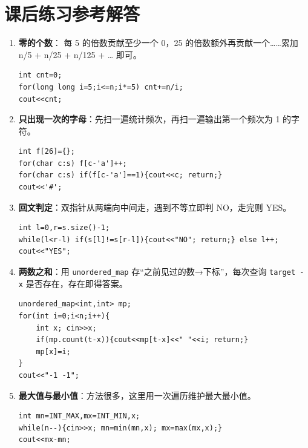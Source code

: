 \documentclass{article}
\begin{document}
\section{课后练习参考解答}

\begin{enumerate}[label=\textbf{S\arabic*.}]
  \item \textbf{零的个数}：
    每 5 的倍数贡献至少一个 0，25 的倍数额外再贡献一个……累加 n/5 + n/25 + n/125 + … 即可。
\begin{lstlisting}
int cnt=0;
for(long long i=5;i<=n;i*=5) cnt+=n/i;
cout<<cnt;
\end{lstlisting}

  \item \textbf{只出现一次的字母}：先扫一遍统计频次，再扫一遍输出第一个频次为 1 的字符。
\begin{lstlisting}
int f[26]={};
for(char c:s) f[c-'a']++;
for(char c:s) if(f[c-'a']==1){cout<<c; return;}
cout<<'#';
\end{lstlisting}

  \item \textbf{回文判定}：双指针从两端向中间走，遇到不等立即判 NO，走完则 YES。
\begin{lstlisting}
int l=0,r=s.size()-1;
while(l<r-l) if(s[l]!=s[r-l]){cout<<"NO"; return;} else l++;
cout<<"YES";
\end{lstlisting}

  \item \textbf{两数之和}：用 \texttt{unordered\_map} 存“之前见过的数→下标”，每次查询 \texttt{target - x} 是否存在，存在即得答案。
\begin{lstlisting}
unordered_map<int,int> mp;
for(int i=0;i<n;i++){
    int x; cin>>x;
    if(mp.count(t-x)){cout<<mp[t-x]<<" "<<i; return;}
    mp[x]=i;
}
cout<<"-1 -1";
\end{lstlisting}

  \item \textbf{最大值与最小值}：方法很多，这里用一次遍历维护最大最小值。
\begin{lstlisting}
int mn=INT_MAX,mx=INT_MIN,x;
while(n--){cin>>x; mn=min(mn,x); mx=max(mx,x);}
cout<<mx-mn;
\end{lstlisting}
\end{enumerate}
\end{document}
